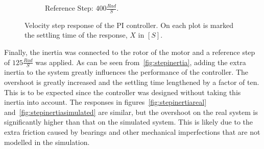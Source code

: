 \begin{figure}[!h]
\begin{subfigure}[t]{.49\linewidth}
		\caption{Reference Step: $400 \frac{Rad}{S}$.}
		\label{fig:step400}
	\end{subfigure}
	\caption[Velocity step response of PI controller.]{Velocity step response of the PI controller. On each plot is marked the settling time of the response, $X$ in $[S]$.}
	\label{fig:step}
\end{figure}

Finally, the inertia was connected to the rotor of the motor and a reference step of $125\frac{Rad}{S}$ was applied.
As can be seen from~\ref{fig:stepinertia}, adding the extra inertia to the system greatly influences the performance of the controller.
The overshoot is greatly increased and the settling time lengthened by a factor of ten.
This is to be expected since the controller was designed without taking this inertia into account.
The responses in figures~\ref{fig:stepinertiareal} and~\ref{fig:stepinertiasimulated} are similar, but the overshoot on the real system is significantly higher than that on the simulated system.
This is likely due to the extra friction caused by bearings and other mechanical imperfections that are not modelled in the simulation.

